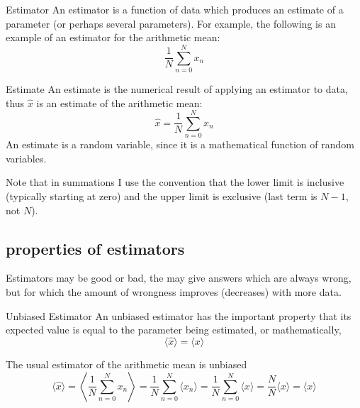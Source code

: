 \begin{definition}{Estimator}
An estimator is a function of data which produces an estimate of a
parameter (or perhaps several parameters).  For example, the following 
is an example of an estimator for the arithmetic mean:
\begin{displaymath}
\frac{1}{N}\sum_{n=0}^N x_n
\end{displaymath}
\end{definition}
\begin{definition}{Estimate}
An estimate is the numerical result of applying an estimator to data,
thus $\hat{x}$ is an estimate of the arithmetic mean:
\begin{displaymath}
\hat{x} = \frac{1}{N}\sum_{n=0}^N x_n
\end{displaymath}
An estimate is a random variable, since it is a mathematical
function of random variables.
\end{definition}

Note that in summations I use the convention that the lower limit is
inclusive (typically starting at zero) and the upper limit is
exclusive (last term is $N-1$, not $N$).

\subsection{properties of estimators}

Estimators may be good or bad, the may give answers which are always
wrong, but for which the amount of wrongness improves (decreases) with
more data.

\begin{definition}{Unbiased Estimator}
An unbiased estimator has the important property that its expected
value is equal to the parameter being estimated, or mathematically,
\begin{displaymath}
\langle \hat{x} \rangle = \langle x \rangle
\end{displaymath}
\end{definition}

\begin{example}{The usual estimator of the arithmetic mean is unbiased}
\begin{displaymath}
\langle \hat{x} \rangle = 
\left\langle\frac{1}{N}\sum_{n=0}^N x_n \right\rangle =
\frac{1}{N}\sum_{n=0}^N \langle x_n \rangle =
\frac{1}{N}\sum_{n=0}^N \langle x \rangle = 
\frac{N}{N}\langle x \rangle = \langle x \rangle
\end{displaymath}
\end{example}

